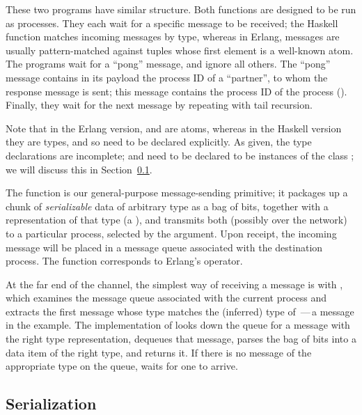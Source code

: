 \documentclass{sigplanconf}
\begin{document}
These two programs have similar structure. Both  functions are designed to be run as processes. They each wait for a specific message to be received; the Haskell  function matches incoming messages by type, whereas in Erlang, messages are usually pattern-matched against tuples whose first element is a well-known atom. The programs wait for a ``pong'' message, and ignore all others. The ``pong'' message contains in its payload the process ID of a ``partner'', to whom the response message is sent; this message contains the process ID of the  process (). Finally, they wait for the next message by repeating with tail recursion.

Note that in the Erlang version,  and  are atoms, whereas in the Haskell version they are types, and so need to be declared explicitly. 
As given, the type declarations are incomplete;  and  need to be declared to be instances of the class ; we will discuss this in Section~\ref{s:serialization}.

The  function is our general-purpose message-sending primitive; it packages up a chunk of \emph{serializable} data of arbitrary type as a bag of bits, 
together with a representation of that type (a ), and transmits both (possibly over the network) to a particular process, selected by the  argument.
Upon receipt, the incoming message will be placed in a message queue associated with the destination process. 
The  function corresponds to Erlang's \textt{!} operator.

At the far end of the channel, the simplest way of receiving a message is with , which
examines the message queue associated with the current process and extracts the first message whose type matches the (inferred) type of \,---\,a  message in the example.  
The implementation of  looks down the queue for a message with the right type representation, 
dequeues that message, parses the bag of bits into a data item of the right type, and returns it.
If there is no message of the appropriate type on the queue,  waits for one to arrive.

\subsection{Serialization} 
\label{s:serialization}
\end{document}
